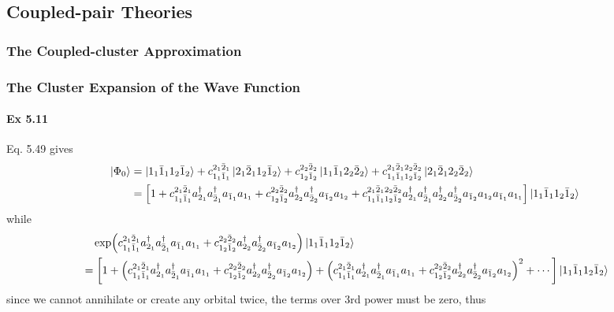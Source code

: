 \documentclass[a4paper]{article}
\newcommand{\ex}[1]{\paragraph{Ex #1}}
\numberwithin{equation}{subsection}
\begin{document}
\subsection{Coupled-pair Theories}
\subsubsection{The Coupled-cluster Approximation}

\subsubsection{The Cluster Expansion of the Wave Function}
\ex{5.11}
Eq. 5.49 gives
\begin{align}
\ket{\Phi_0} &= \ket{1_1 \bar{1}_1 1_2 \bar{1}_2} 
+ c_{1_1 \bar{1}_1}^{2_1 \bar{2}_1} \ket{2_1\bar{2}_1 1_2\bar{1}_2}
+ c_{1_2 \bar{1}_2}^{2_2 \bar{2}_2} \ket{1_1\bar{1}_1 2_2\bar{2}_2}
+ c_{1_1 \bar{1}_1 1_2 \bar{1}_2}^{2_1 \bar{2}_1 2_2 \bar{2}_2} \ket{2_1\bar{2}_1 2_2\bar{2}_2} \notag\\
&= \qty[1
+ c_{1_1 \bar{1}_1}^{2_1 \bar{2}_1} a^\dagger_{2_1}a^\dagger_{\bar{2}_1} a_{\bar{1}_1}a_{1_1} 
+ c_{1_2 \bar{1}_2}^{2_2 \bar{2}_2} a^\dagger_{2_2}a^\dagger_{\bar{2}_2} a_{\bar{1}_2}a_{1_2}  
+ c_{1_1 \bar{1}_1 1_2 \bar{1}_2}^{2_1 \bar{2}_1 2_2 \bar{2}_2} a^\dagger_{2_1}a^\dagger_{\bar{2}_1}a^\dagger_{2_2}a^\dagger_{\bar{2}_2} a_{\bar{1}_2}a_{1_2}a_{\bar{1}_1}a_{1_1} ] \ket{1_1\bar{1}_1 1_2\bar{1}_2} %
\end{align}
while
\begin{align}
& \quad \exp(c_{1_1 \bar{1}_1}^{2_1 \bar{2}_1} a^\dagger_{2_1}a^\dagger_{\bar{2}_1} a_{\bar{1}_1}a_{1_1} + c_{1_2 \bar{1}_2}^{2_2 \bar{2}_2} a^\dagger_{2_2}a^\dagger_{\bar{2}_2} a_{\bar{1}_2}a_{1_2}
) \ket{1_1 \bar{1}_1 1_2 \bar{1}_2} \notag\\
&= \qty[ 1 
+ \qty(c_{1_1 \bar{1}_1}^{2_1 \bar{2}_1} a^\dagger_{2_1}a^\dagger_{\bar{2}_1} a_{\bar{1}_1}a_{1_1} + c_{1_2 \bar{1}_2}^{2_2 \bar{2}_2} a^\dagger_{2_2}a^\dagger_{\bar{2}_2} a_{\bar{1}_2}a_{1_2}) 
+ \qty(c_{1_1 \bar{1}_1}^{2_1 \bar{2}_1} a^\dagger_{2_1}a^\dagger_{\bar{2}_1} a_{\bar{1}_1}a_{1_1} + c_{1_2 \bar{1}_2}^{2_2 \bar{2}_2} a^\dagger_{2_2}a^\dagger_{\bar{2}_2} a_{\bar{1}_2}a_{1_2})^2 + \cdots
] \ket{1_1 \bar{1}_1 1_2 \bar{1}_2} %
\end{align}
since we cannot annihilate or create any orbital twice, the terms over 3rd power must be zero, thus
\end{document}
